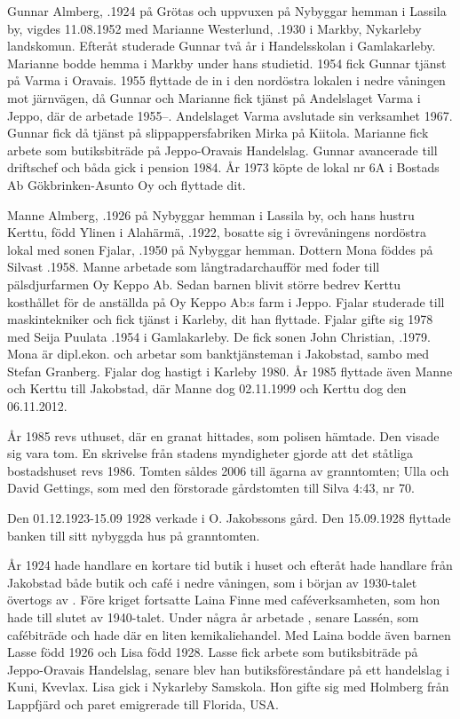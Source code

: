 Gunnar Almberg, .1924 på Grötas och uppvuxen på Nybyggar hemman i Lassila by, vigdes 11.08.1952 med Marianne Westerlund, .1930 i Markby, Nykarleby landskomun. Efteråt studerade Gunnar två år i Handelsskolan i Gamlakarleby. Marianne bodde hemma i Markby under hans studietid. 1954 fick Gunnar tjänst på Varma i Oravais. 1955 flyttade de in i den nordöstra lokalen i nedre våningen mot järnvägen, då Gunnar och Marianne fick tjänst på Andelslaget Varma i Jeppo, där de arbetade 1955--. Andelslaget Varma avslutade sin verksamhet 1967. Gunnar fick då tjänst på slippappersfabriken Mirka på Kiitola. Marianne fick arbete som butiksbiträde på Jeppo-Oravais Handelslag. Gunnar avancerade till driftschef och båda gick i pension 1984. År 1973 köpte de lokal nr 6A i Bostads Ab Gökbrinken-Asunto Oy och flyttade dit.

Manne Almberg, .1926 på Nybyggar hemman i Lassila by, och hans hustru Kerttu, född Ylinen i Alahärmä, .1922, bosatte sig i övrevåningens nordöstra lokal med sonen Fjalar, .1950 på Nybyggar hemman. Dottern Mona föddes på Silvast .1958. Manne arbetade som långtradarchaufför med foder till pälsdjurfarmen Oy Keppo Ab. Sedan barnen blivit större bedrev Kerttu kosthållet för de anställda på Oy Keppo Ab:s farm i Jeppo.  Fjalar studerade till maskintekniker och fick tjänst i Karleby, dit han flyttade. Fjalar gifte sig 1978 med Seija Puulata .1954 i Gamlakarleby. De fick sonen John Christian, .1979. Mona är dipl.ekon. och arbetar som banktjänsteman i Jakobstad, sambo med Stefan Granberg. Fjalar dog hastigt i Karleby 1980. År 1985 flyttade även Manne och Kerttu till Jakobstad, där Manne dog 02.11.1999 och Kerttu dog den 06.11.2012.

År 1985 revs uthuset, där en granat hittades, som polisen hämtade. Den visade sig vara tom. En skrivelse från stadens myndigheter gjorde att det ståtliga bostadshuset revs 1986. Tomten såldes 2006 till ägarna av granntomten; Ulla och David Gettings, som med den förstorade gårdstomten till Silva 4:43, nr 70.




Den 01.12.1923-15.09 1928 verkade  i O. Jakobssons gård. Den 15.09.1928 flyttade banken till sitt nybyggda hus på granntomten.

År 1924 hade handlare  en kortare tid butik i huset och efteråt hade handlare  från Jakobstad både butik och café i nedre våningen, som i början av 1930-talet övertogs av . Före kriget fortsatte {Laina Finne} med caféverksamheten, som hon hade till slutet av 1940-talet. Under några år arbetade , senare Lassén, som cafébiträde och hade där en liten kemikaliehandel. Med Laina bodde även barnen Lasse född 1926 och Lisa född 1928. Lasse fick arbete som butiksbiträde på Jeppo-Oravais Handelslag, senare blev han butiksföreståndare på ett handelslag i Kuni, Kvevlax.  Lisa gick i Nykarleby Samskola. Hon gifte sig med Holmberg från Lappfjärd och paret emigrerade till Florida, USA.

